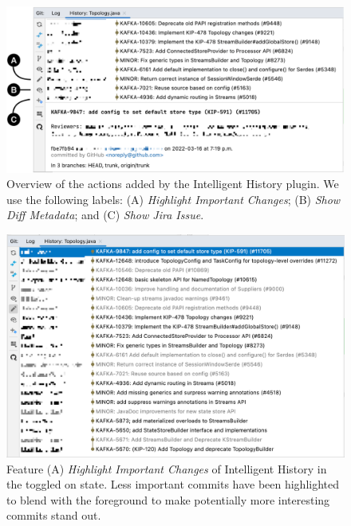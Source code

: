 \begin{figure}
    \includegraphics[width=\textwidth]{./images/intelligent-history-overview.png}
    \caption{
        Overview of the actions added by the Intelligent History plugin. We use the following labels: (A) \textit{Highlight Important Changes}; (B) \textit{Show Diff Metadata}; and (C) \textit{Show Jira Issue}.
    }
    \label{fig:Intelligent-History-Overview}
\end{figure}

\begin{figure}
    \includegraphics[width=\textwidth]{./images/intelligent-history-A.png}
    \caption{
        Feature (A) \textit{Highlight Important Changes} of Intelligent History in the toggled on state. Less important commits have been highlighted to blend with the foreground to make potentially more interesting commits stand out.
    }
    \label{fig:Intelligent-History-A}
\end{figure}

